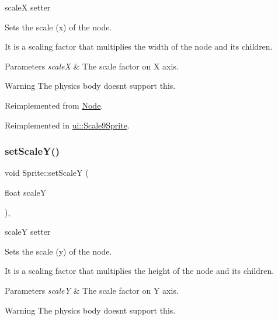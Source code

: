 scaleX setter 

Sets the scale (x) of the node.

It is a scaling factor that multiplies the width of the node and its children.


\begin{DoxyParams}{Parameters}
{\em scaleX} & The scale factor on X axis.\\
\hline
\end{DoxyParams}
\begin{DoxyWarning}{Warning}
The physics body doesn\textquotesingle{}t support this. 
\end{DoxyWarning}


Reimplemented from \hyperlink{classNode_acf7f04074f7f49972e152788c090b877}{Node}.



Reimplemented in \hyperlink{classui_1_1Scale9Sprite_a7f9db0e954aca485c0d37a665927881c}{ui\+::\+Scale9\+Sprite}.

\mbox{\label{classSprite_a167e418b057071cbaf57f75f7c88c9df}} 
\subsubsection{\texorpdfstring{set\+Scale\+Y()}{setScaleY()}\hspace{0.1cm}{\footnotesize\ttfamily [1/2]}}
{\footnotesize\ttfamily void Sprite\+::set\+ScaleY (\begin{DoxyParamCaption}\item[{float}]{scaleY }\end{DoxyParamCaption})\hspace{0.3cm}{\ttfamily [override]}, {\ttfamily [virtual]}}



scaleY setter 

Sets the scale (y) of the node.

It is a scaling factor that multiplies the height of the node and its children.


\begin{DoxyParams}{Parameters}
{\em scaleY} & The scale factor on Y axis.\\
\hline
\end{DoxyParams}
\begin{DoxyWarning}{Warning}
The physics body doesn\textquotesingle{}t support this. 
\end{DoxyWarning}


